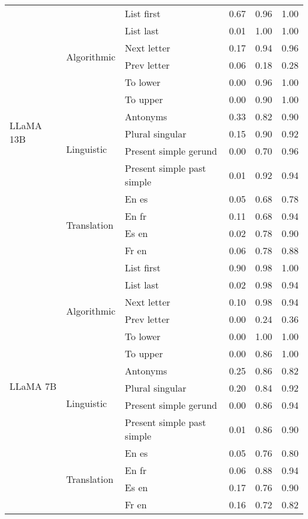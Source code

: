 \begin{center}
\begin{longtable}{lllrrr}
\multirow[t]{14}{*}{LLaMA 13B} & \multirow[t]{6}{*}{Algorithmic} & List first & 0.67 & 0.96 & 1.00 \\
 &  & List last & 0.01 & 1.00 & 1.00 \\
 &  & Next letter & 0.17 & 0.94 & 0.96 \\
 &  & Prev letter & 0.06 & 0.18 & 0.28 \\
 &  & To lower & 0.00 & 0.96 & 1.00 \\
 &  & To upper & 0.00 & 0.90 & 1.00 \\
\cline{2-6}
 & \multirow[t]{4}{*}{Linguistic} & Antonyms & 0.33 & 0.82 & 0.90 \\
 &  & Plural singular & 0.15 & 0.90 & 0.92 \\
 &  & Present simple gerund & 0.00 & 0.70 & 0.96 \\
 &  & Present simple past simple & 0.01 & 0.92 & 0.94 \\
\cline{2-6}
 & \multirow[t]{4}{*}{Translation} & En es & 0.05 & 0.68 & 0.78 \\
 &  & En fr & 0.11 & 0.68 & 0.94 \\
 &  & Es en & 0.02 & 0.78 & 0.90 \\
 &  & Fr en & 0.06 & 0.78 & 0.88 \\
\cline{1-6} \cline{2-6}
\multirow[t]{14}{*}{LLaMA 7B} & \multirow[t]{6}{*}{Algorithmic} & List first & 0.90 & 0.98 & 1.00 \\
 &  & List last & 0.02 & 0.98 & 0.94 \\
 &  & Next letter & 0.10 & 0.98 & 0.94 \\
 &  & Prev letter & 0.00 & 0.24 & 0.36 \\
 &  & To lower & 0.00 & 1.00 & 1.00 \\
 &  & To upper & 0.00 & 0.86 & 1.00 \\
\cline{2-6}
 & \multirow[t]{4}{*}{Linguistic} & Antonyms & 0.25 & 0.86 & 0.82 \\
 &  & Plural singular & 0.20 & 0.84 & 0.92 \\
 &  & Present simple gerund & 0.00 & 0.86 & 0.94 \\
 &  & Present simple past simple & 0.01 & 0.86 & 0.90 \\
\cline{2-6}
 & \multirow[t]{4}{*}{Translation} & En es & 0.05 & 0.76 & 0.80 \\
 &  & En fr & 0.06 & 0.88 & 0.94 \\
 &  & Es en & 0.17 & 0.76 & 0.90 \\
 &  & Fr en & 0.16 & 0.72 & 0.82 \\
\cline{1-6} \cline{2-6}

\end{longtable}
\end{center}

